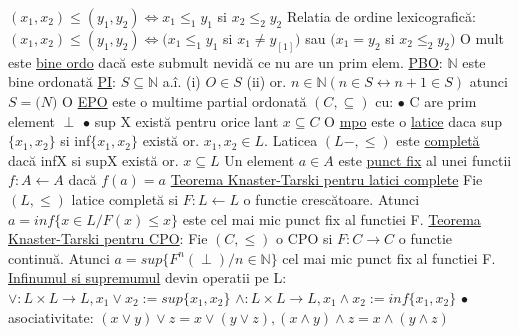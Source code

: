 \documentclass[8pt,twocolumn]{extarticle}
\begin{document}
	$(x_{1}, x_{2}) \leq (y_{1}, y_{2}) \Leftrightarrow x_{1} \leq _{1} y_{1}$ si $x_{2} \leq _{2} y_{2}$ \newline
	Relatia de ordine lexicografică: \newline
	$(x_{1}, x_{2}) \leq (y_{1}, y_{2}) \Leftrightarrow (x_{1} \leq _{1} y_{1}$ si $x_{1} \neq y_[1])$ sau $(x_{1} = y_{2}$ si $x_{2} \leq _{2} y_{2})$ \newline
	O mult este \underline{bine ordo} dacă este submult nevidă ce nu are un prim elem. \newline
	\underline{PBO}: $\mathbb{N}$ este bine ordonată \newline
	\underline{PI}: $S \subseteq \mathbb{N}$ a.î. (i) $O \in S$ \newline
	(ii) or. $n \in \mathbb{N} (n \in S \leftrightarrow n + 1 \in S)$ atunci $S = \mathbb(N)$ \newline
	O \underline{EPO} este o multime partial ordonată $(C, \subseteq)$ cu: \newline
	$\bullet$ C are prim element $\perp$ $\bullet$ sup X există pentru orice lant $x \subseteq C$ \newline
	O \underline{mpo} este o \underline{latice} daca sup$\{x_{1}, x_{2}\}$ si inf$\{x_{1}, x_{2}\}$ există or. $x_{1}, x_{2} \in L$. Laticea $(L-, \leq)$ este \underline{completă} dacă infX si supX există or. $x \subseteq L$ \newline
	Un element $a \in A$ este \underline{punct fix} al unei functii $f: A \leftarrow A$ dacă $f(a) = a$ \newline
	\underline{Teorema Knaster-Tarski pentru latici complete} \newline
	Fie $(L, \leq)$ latice completă si $F: L \leftarrow L$ o functie crescătoare. Atunci $a = inf\{ x \in L / F(x) \leq x \}$ este cel mai mic punct fix al functiei F. \newline
	\underline{Teorema Knaster-Tarski pentru CPO}: \newline
	Fie $(C, \leq)$ o CPO si $F: C \rightarrow C$ o functie continuă. Atunci $a = sup\{ F^{n}(\perp) / n \in \mathbb{N} \}$ cel mai mic punct fix al functiei F. \newline
	\underline{Infinumul si supremumul} devin operatii pe L: \newline
	$\vee : L \times L \rightarrow L, x_{1} \vee x_{2} := sup\{ x_{1}, x_{2} \}$ \newline
	$\wedge : L \times L \rightarrow L, x_{1} \wedge x_{2} := inf\{ x_{1}, x_{2} \}$ \newline
	$\bullet$ asociativitate: $(x \vee y) \vee z = x \vee (y \vee z), (x \wedge y) \wedge z = x \wedge (y \wedge z)$ \newline
\end{document}
